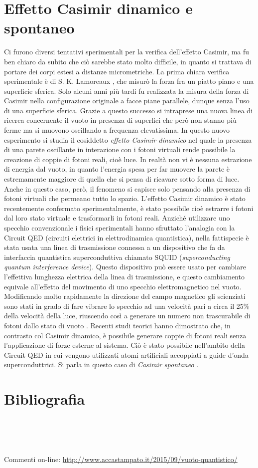 \section*{Effetto Casimir dinamico e spontaneo}
Ci furono diversi tentativi sperimentali per la verifica dell'effetto Casimir, ma fu ben chiaro da subito che ciò sarebbe stato molto difficile, in quanto si trattava di portare dei corpi estesi a distanze micrometriche. La prima chiara verifica sperimentale è di S. K. Lamoreaux \cite{Lamoreaux}, che misurò la forza fra un piatto piano e una superficie sferica. Solo alcuni anni più tardi fu realizzata la misura della forza di Casimir nella configurazione originale a facce piane parallele, dunque senza l'uso di una superficie sferica. Grazie a questo successo si intraprese una nuova linea di ricerca concernente il vuoto in presenza di superfici che però non stanno più ferme ma si muovono oscillando a frequenza elevatissima. In questo nuovo esperimento si studia il cosiddetto \emph{effetto Casimir dinamico} nel quale la presenza di una parete oscillante in interazione con i fotoni virtuali rende possibile la creazione di coppie di fotoni reali, cioè luce. In realtà non vi è nessuna estrazione di energia dal vuoto, in quanto l'energia spesa per far muovere la parete è estremamente maggiore di quella che si pensa di ricavare sotto forma di luce. Anche in questo caso, però, il fenomeno si capisce solo pensando alla presenza di fotoni virtuali che permeano tutto lo spazio. L'effetto Casimir dinamico è stato recentemente confermato sperimentalmente, è stato possibile cioè estrarre i fotoni dal loro stato virtuale e trasformarli in fotoni reali. Anziché utilizzare uno specchio convenzionale i fisici sperimentali hanno sfruttato l'analogia con la Circuit QED (circuiti elettrici in elettrodinamica quantistica), nella fattispecie è stata usata una linea di trasmissione connessa a un dispositivo che fa da interfaccia quantistica superconduttiva chiamato SQUID (\emph{superconducting quantum interference device}). Questo dispositivo può essere usato per cambiare l'effettiva lunghezza elettrica della linea di trasmissione, e questo cambiamento equivale all'effetto del movimento di uno specchio elettromagnetico nel vuoto.
Modificando molto rapidamente la direzione del campo magnetico  gli scienziati
sono stati in grado di fare vibrare lo specchio ad una velocità pari a circa il 25\% della velocità della luce, riuscendo così a generare un numero non trascurabile di fotoni dallo stato di vuoto \cite{wilson}. Recenti studi teorici hanno dimostrato che, in contrasto col Casimir dinamico, è possibile generare coppie di fotoni reali senza l'applicazione di forze esterne al sistema. Ciò è stato possibile nell'ambito della Circuit QED in cui vengono utilizzati atomi artificiali accoppiati a guide d'onda superconduttrici. Si parla in questo caso di \emph{Casimir spontaneo} \cite{stassi}.

\balance
\section*{Bibliografia}
\\
\\
\\

\smallskip
Commenti on-line: \url{http://www.accastampato.it/2015/09/vuoto-quantistico/}
